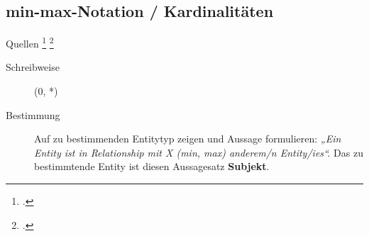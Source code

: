 \documentclass{bschlangaul-theorie}
\begin{document}
\subsection{min-max-Notation / Kardinalitäten}

Quellen
\footcite[2.7.3 Seite 46]{kemper}
\footcite[Seite 62]{brinda}

\begin{description}
\item[Schreibweise] (0, *)
\item[Bestimmung]

Auf zu bestimmenden Entitytyp zeigen und Aussage formulieren:
%
\emph{„Ein Entity ist in Relationship mit X (min, max) anderem/n
Entity/ies“.}
%
Das zu bestimmtende Entity ist diesen Aussagesatz \textbf{Subjekt}.
\end{description}

\literatur
\end{document}
